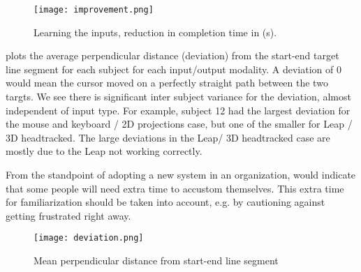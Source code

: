 \begin{figure}
    \centering
    \texttt{[image: improvement.png]}
    \caption{Learning the inputs, reduction in completion time in (s).}
    \label{fig:improvementtimes}
\end{figure}

 plots the average perpendicular distance (deviation) from
the start-end target line segment for each subject for each input/output
modality.  A deviation of 0 would mean the cursor moved on a perfectly
straight path between the two targts.  We see there is significant inter
subject variance for the deviation, almost independent of input type.  For
example, subject 12 had the largest deviation for the mouse and keyboard / 2D
projections case, but one of the smaller for Leap / 3D headtracked.  The large
deviations in the Leap/ 3D headtracked case are mostly due to the Leap not
working correctly.

From the standpoint of adopting a new system in an organization,
 would indicate that some people will need extra time to
accustom themselves.  This extra time for familiarization should be taken into
account, e.g. by cautioning against getting frustrated right away.

\begin{figure}
  \centering
  \texttt{[image: deviation.png]}
  \caption{Mean perpendicular distance from start-end line segment}
  \label{fig:deviation}
\end{figure}

